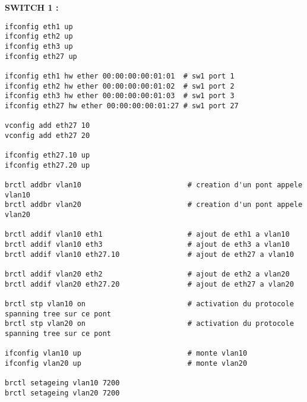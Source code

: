 \documentclass[a4paper]{article}
\begin{document}
\textbf{SWITCH 1 : }

\begin{verbatim}
ifconfig eth1 up
ifconfig eth2 up
ifconfig eth3 up
ifconfig eth27 up

ifconfig eth1 hw ether 00:00:00:00:01:01  # sw1 port 1
ifconfig eth2 hw ether 00:00:00:00:01:02  # sw1 port 2
ifconfig eth3 hw ether 00:00:00:00:01:03  # sw1 port 3
ifconfig eth27 hw ether 00:00:00:00:01:27 # sw1 port 27

vconfig add eth27 10
vconfig add eth27 20

ifconfig eth27.10 up
ifconfig eth27.20 up

brctl addbr vlan10                         # creation d'un pont appele vlan10
brctl addbr vlan20                         # creation d'un pont appele vlan20

brctl addif vlan10 eth1                    # ajout de eth1 a vlan10
brctl addif vlan10 eth3                    # ajout de eth3 a vlan10
brctl addif vlan10 eth27.10                # ajout de eth27 a vlan10

brctl addif vlan20 eth2                    # ajout de eth2 a vlan20
brctl addif vlan20 eth27.20                # ajout de eth27 a vlan20

brctl stp vlan10 on                        # activation du protocole spanning tree sur ce pont
brctl stp vlan20 on                        # activation du protocole spanning tree sur ce pont

ifconfig vlan10 up                         # monte vlan10
ifconfig vlan20 up                         # monte vlan20

brctl setageing vlan10 7200
brctl setageing vlan20 7200
\end{verbatim}
	
\end{document}
